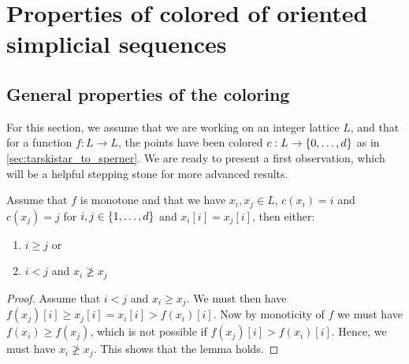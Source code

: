 \section{Properties of colored of oriented simplicial sequences}

\subsection{General properties of the coloring}

For this section, we assume that we are working on an integer lattice $L$, and that for a function $f: L \rightarrow L$, the points have been colored $c : L \rightarrow \left\{0, \dots, d\right\}$ as in \cref{sec:tarskistar_to_sperner}. We are ready to present a first observation, which will be a helpful stepping stone for more advanced results.

\begin{lemma}
	\label{lem:monotone_coloring}
	Assume that $f$ is monotone and that we have $x_i, x_j \in L$, $c(x_i) = i$ and $c(x_j) = j$ for $i, j \in \left\{1, \dots, d\right\}$ and $x_i[i] = x_j[i]$, then either:
	\begin{enumerate}
		\item $i \geq j$ or
		\item $i < j$ and $x_i \not\geq x_j$
	\end{enumerate}
\end{lemma}
\begin{proof}
	Assume that $i < j$ and $x_i \geq x_j$. We must then have $f(x_j)[i] \geq x_j[i] = x_i[i] > f(x_i)[i]$. Now by monoticity of $f$ we must have $f(x_i) \geq f(x_j)$, which is not possible if $f(x_j)[i] > f(x_i)[i]$. Hence, we must have $x_i \not\geq x_j$. This shows that the lemma holds.
\end{proof}

